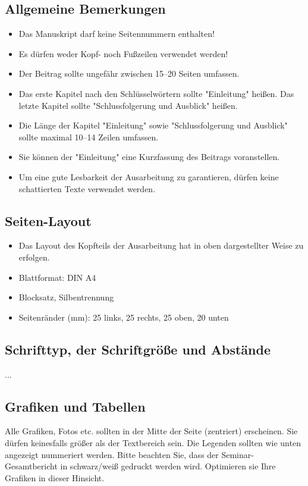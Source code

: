 \documentclass[12pt,paper=a4]{scrartcl}
\begin{document}
\subsection{Allgemeine Bemerkungen}
\begin{itemize}
	\item Das Manuskript darf keine Seitennummern enthalten!
	\item Es dürfen weder Kopf- noch Fußzeilen verwendet werden!
	\item Der Beitrag sollte ungefähr zwischen 15--20 Seiten umfassen.
	\item Das erste Kapitel nach den Schlüsselwörtern sollte "Einleitung" heißen. Das letzte Kapitel sollte "Schlussfolgerung und Ausblick" heißen.
	\item Die Länge der Kapitel "Einleitung" sowie "Schlussfolgerung und Ausblick" sollte maximal 10--14 Zeilen umfassen.
	\item Sie können der "Einleitung" eine Kurzfassung des Beitrags voranstellen.
	\item Um eine gute Lesbarkeit der Ausarbeitung zu garantieren, dürfen keine schattierten Texte verwendet werden.
\end{itemize}


\subsection{Seiten-Layout}
\begin{itemize}
	\item Das Layout des Kopfteils der Ausarbeitung hat in oben dargestellter Weise zu erfolgen.
	\item Blattformat: DIN A4
	\item Blocksatz, Silbentrennung
	\item Seitenränder (mm): 25 links, 25 rechts, 25 oben, 20 unten
\end{itemize}


\subsection{Schrifttyp, der Schriftgröße und Abstände}
...
\pagebreak


\subsection{Grafiken und Tabellen}
Alle Grafiken, Fotos etc. sollten in der Mitte der Seite (zentriert) erscheinen.
Sie dürfen keinesfalls größer als der Textbereich sein.
Die Legenden sollten wie unten angezeigt nummeriert werden.
Bitte beachten Sie, dass der Seminar-Gesamtbericht in schwarz/weiß gedruckt werden wird.
Optimieren sie Ihre Grafiken in dieser Hinsicht.
\end{document}
